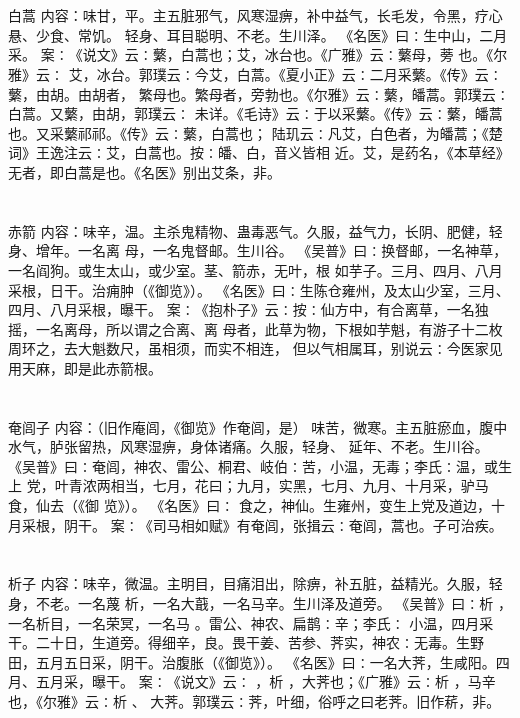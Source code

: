 \documentclass[12pt,UTF8]{ctexbook}
\begin{document}
\chapter{}白蒿
内容：味甘，平。主五脏邪气，风寒湿痹，补中益气，长毛发，令黑，疗心悬、少食、常饥。 
轻身、耳目聪明、不老。生川泽。 
《名医》曰∶生中山，二月采。 
案∶《说文》云∶蘩，白蒿也；艾，冰台也。《广雅》云∶蘩母，蒡 也。《尔雅》云∶ 
艾，冰台。郭璞云∶今艾，白蒿。《夏小正》云∶二月采蘩。《传》云∶蘩，由胡。由胡者， 
繁母也。繁母者，旁勃也。《尔雅》云∶蘩，皤蒿。郭璞云∶白蒿。又蘩，由胡，郭璞云∶ 
未详。《毛诗》云∶于以采蘩。《传》云∶蘩，皤蒿也。又采蘩祁祁。《传》云∶蘩，白蒿也； 
陆玑云∶凡艾，白色者，为皤蒿；《楚词》王逸注云∶艾，白蒿也。按∶皤、白，音义皆相 
近。艾，是药名，《本草经》无者，即白蒿是也。《名医》别出艾条，非。 


\chapter{}赤箭
内容：味辛，温。主杀鬼精物、蛊毒恶气。久服，益气力，长阴、肥健，轻身、增年。一名离 
母，一名鬼督邮。生川谷。 
《吴普》曰∶换督邮，一名神草，一名阎狗。或生太山，或少室。茎、箭赤，无叶，根 
如芋子。三月、四月、八月采根，日干。治痈肿（《御览》）。 
《名医》曰∶生陈仓雍州，及太山少室，三月、四月、八月采根，曝干。 
案∶《抱朴子》云∶按∶仙方中，有合离草，一名独摇，一名离母，所以谓之合离、离 
母者，此草为物，下根如芋魁，有游子十二枚周环之，去大魁数尺，虽相须，而实不相连， 
但以气相属耳，别说云∶今医家见用天麻，即是此赤箭根。 


\chapter{}奄闾子
内容：（旧作庵闾，《御览》作奄闾，是） 
味苦，微寒。主五脏瘀血，腹中水气，胪张留热，风寒湿痹，身体诸痛。久服，轻身、 
延年、不老。生川谷。 
《吴普》曰∶奄闾，神农、雷公、桐君、岐伯∶苦，小温，无毒；李氏∶温，或生上 
党，叶青浓两相当，七月，花曰；九月，实黑，七月、九月、十月采，驴马食，仙去（《御 
览》）。 
《名医》曰∶ 食之，神仙。生雍州，变生上党及道边，十月采根，阴干。 
案∶《司马相如赋》有奄闾，张揖云∶奄闾，蒿也。子可治疾。 


\chapter{}析子
内容：味辛，微温。主明目，目痛泪出，除痹，补五脏，益精光。久服，轻身，不老。一名蔑 
析，一名大蕺，一名马辛。生川泽及道旁。 
《吴普》曰∶析 ，一名析目，一名荣冥，一名马 。雷公、神农、扁鹊∶辛；李氏∶ 
小温，四月采干。二十日，生道旁。得细辛，良。畏干姜、苦参、荠实，神农∶无毒。生野 
田，五月五日采，阴干。治腹胀（《御览》）。 
《名医》曰∶一名大荠，生咸阳。四月、五月采，曝干。 
案∶《说文》云∶ ，析 ，大荠也；《广雅》云∶析 ，马辛也，《尔雅》云∶析 、 
大荠。郭璞云∶荠，叶细，俗呼之曰老荠。旧作菥，非。 
\end{document}
